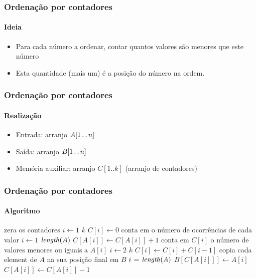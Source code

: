 \documentclass{beamer}
\begin{document}
\begin{frame}

  \frametitle{Ordenação por contadores}
  \framesubtitle{Ideia}
  \begin{itemize}

    \item Para cada número a ordenar, contar quantos valores são menores que este número

    \item Esta quantidade (mais um) é a posição do número na ordem.
      
  \end{itemize}
\end{frame}

\begin{frame}

  \frametitle{Ordenação por contadores}
  \framesubtitle{Realização}
  \begin{itemize}

    \item Entrada: arranjo $A [ 1 \mathinner{\ldotp\ldotp} n ]$

    \item Saída: arranjo $B [ 1 \mathinner{\ldotp\ldotp} n]$

    \item Memória auxiliar: arranjo $C[1..k]$ (arranjo de contadores)

  \end{itemize}
\end{frame}

\begin{frame}

\frametitle{Ordenação por contadores}
\framesubtitle{Algoritmo}
\begin{codebox}
\zi \Comment zera os contadores
\li \For $i \gets 1$ \To $k$
\li \Do $C[i] \gets 0$
    \End
\zi \Comment conta em o número de ocorrências de cada valor
\li \For $i \gets 1$ \To $\id{length}(A)$
\li \Do $C[A[i]] \gets C[A[i]] + 1$
    \End
\zi \Comment conta em $C[i]$ o número de valores menores ou iguais a $A[i]$
\li \For $i \gets 2$ \To $k$
\li \Do $C[i] \gets C[i] + C[i-1]$
    \End
\zi \Comment copia cada element de $A$ na sua posição final em $B$
\li \For $i \gets \id{length}(A)$ 
\li \Do $B[C[A[i]]] \gets A[i]$
\li   $C[A[i]] \gets C[A[i]] - 1$
    \End
\end{codebox}

\end{frame}
\end{document}
